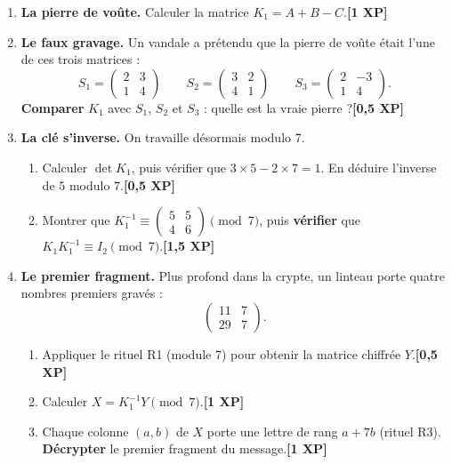\documentclass[11pt,a4paper]{article}
\newcommand{\Epx}[1]{\textcolor{or}{\textbf{[#1 XP]}}}
\begin{document}
\begin{enumerate}[label=\textbf{A.\arabic*.},leftmargin=10mm]
  \item \textbf{La pierre de voûte.} Calculer la matrice
        $K_1 = A + B - C$.\Epx{1}
  \item \textbf{Le faux gravage.} Un vandale a prétendu que la pierre de voûte
        était l'une de ces trois matrices :
        \[
        S_1=\begin{pmatrix}2&3\\1&4\end{pmatrix}\qquad
        S_2=\begin{pmatrix}3&2\\4&1\end{pmatrix}\qquad
        S_3=\begin{pmatrix}2&-3\\1&4\end{pmatrix}.
        \]
        \textbf{Comparer} $K_1$ avec $S_1$, $S_2$ et $S_3$ : quelle est la vraie
        pierre ?\Epx{0,5}
  \item \textbf{La clé s'inverse.} On travaille désormais modulo 7.
        \begin{enumerate}[label=\alph*)]
          \item Calculer $\det K_1$, puis vérifier que $3\times 5 - 2\times 7 = 1$.
                En déduire l'inverse de $5$ modulo 7.\Epx{0,5}
          \item Montrer que
                $K_1^{-1} \equiv \begin{pmatrix}5&5\\4&6\end{pmatrix} \pmod 7$,
                puis \textbf{vérifier} que $K_1 K_1^{-1} \equiv I_2 \pmod 7$.\Epx{1,5}
        \end{enumerate}
  \item \textbf{Le premier fragment.} Plus profond dans la crypte, un
        linteau porte quatre nombres premiers gravés :
        \[
        \begin{pmatrix}11 & 7\\ 29 & 7\end{pmatrix}.
        \]
        \begin{enumerate}[label=\alph*)]
          \item Appliquer le rituel R1 (module 7) pour obtenir la matrice
                chiffrée $Y$.\Epx{0,5}
          \item Calculer $X = K_1^{-1}Y \pmod 7$.\Epx{1}
          \item Chaque colonne $(a,b)$ de $X$ porte une lettre de rang $a+7b$
                (rituel R3). \textbf{Décrypter} le premier fragment du message.\Epx{1}
        \end{enumerate}
\end{enumerate}
\end{document}
